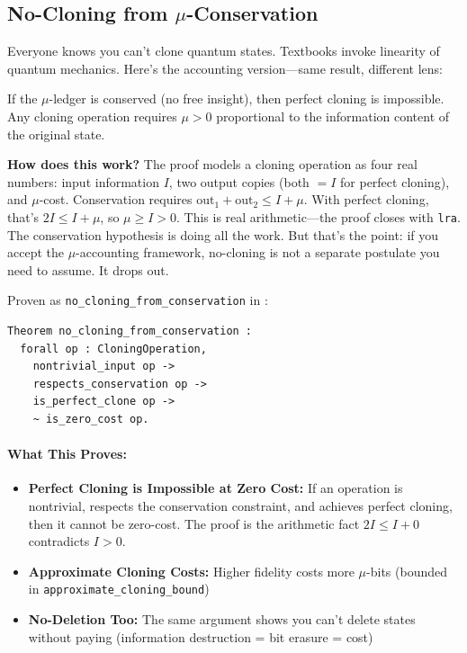 \subsection{No-Cloning from $\mu$-Conservation}

Everyone knows you can't clone quantum states. Textbooks invoke linearity of quantum mechanics. Here's the accounting version---same result, different lens:

\begin{theorem}
If the $\mu$-ledger is conserved (no free insight), then perfect cloning is impossible. Any cloning operation requires $\mu > 0$ proportional to the information content of the original state.
\end{theorem}

\textbf{How does this work?} The proof models a cloning operation as four real numbers: input information $I$, two output copies (both $= I$ for perfect cloning), and $\mu$-cost. Conservation requires $\text{out}_1 + \text{out}_2 \leq I + \mu$. With perfect cloning, that's $2I \leq I + \mu$, so $\mu \geq I > 0$. This is real arithmetic---the proof closes with \texttt{lra}. The conservation hypothesis is doing all the work. But that's the point: if you accept the $\mu$-accounting framework, no-cloning is not a separate postulate you need to assume. It drops out.

Proven as \texttt{no\_cloning\_from\_conservation} in :
\begin{lstlisting}
Theorem no_cloning_from_conservation :
  forall op : CloningOperation,
    nontrivial_input op ->
    respects_conservation op ->
    is_perfect_clone op ->
    ~ is_zero_cost op.
\end{lstlisting}

\paragraph{What This Proves:}
\begin{itemize}
    \item \textbf{Perfect Cloning is Impossible at Zero Cost:} If an operation is nontrivial, respects the conservation constraint, and achieves perfect cloning, then it cannot be zero-cost. The proof is the arithmetic fact $2I \leq I + 0$ contradicts $I > 0$.
    \item \textbf{Approximate Cloning Costs:} Higher fidelity costs more $\mu$-bits (bounded in \texttt{approximate\_cloning\_bound})
    \item \textbf{No-Deletion Too:} The same argument shows you can't delete states without paying (information destruction = bit erasure = cost)
\end{itemize}


